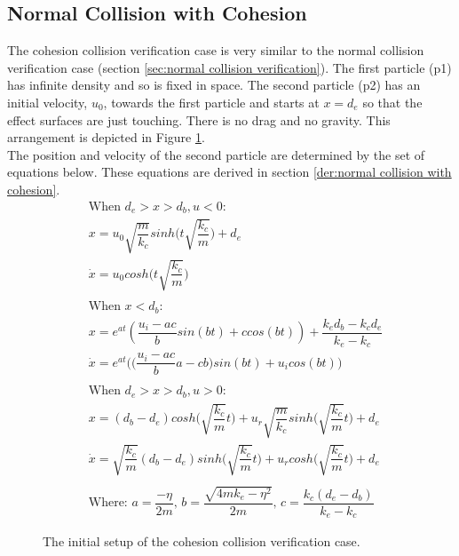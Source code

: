 \documentclass[a4paper,11pt,titlepage]{report}
\begin{document}
\subsection{Normal Collision with Cohesion}
\label{sec:normal collision with cohesion verification}
The cohesion collision verification case is very similar to the normal collision verification case (section \ref{sec:normal collision verification}). The first particle (p1) has infinite density and so is fixed in space. The second particle (p2) has an initial velocity, $u_0$, towards the first particle and starts at $x = d_e$ so that the effect surfaces are just touching. There is no drag and no gravity. This arrangement is depicted in Figure \ref{fig:cohesion collision}.
\\The position and velocity of the second particle are determined by the set of equations below. These equations are derived in section \ref{der:normal collision with cohesion}.
\begin{align}
&\text{When $d_e > x > d_b, u < 0$:} \nonumber \\
&x = u_0 \sqrt{\dfrac{m}{k_c}} sinh\Big(t\sqrt{\dfrac{k_c}{m}}\Big) + d_e \\
&\dot{x} = u_0 cos h\Big(t\sqrt{\dfrac{k_c}{m}}\Big) \\ \nonumber \\
&\text{When $x < d_b$:} \nonumber \\
&x = e^{at} (\dfrac{u_i - ac}{b} sin(bt) + c cos (bt)) + \dfrac{k_e d_b - k_c d_e}{k_e - k_c} \\
&\dot{x} = e^{at}\Big(\Big(\dfrac{u_i - ac}{b} a - c b\Big)sin(bt) + u_i cos(bt)\Big) \\ \nonumber \\
&\text{When $d_e > x > d_b, u > 0$:} \nonumber \\
&x = (d_b - d_e)cosh\Big(\sqrt{\dfrac{k_c}{m}} t\Big) + u_r \sqrt{\dfrac{m}{k_c}} sinh\Big(\sqrt{\dfrac{k_c}{m}}t\Big) + d_e \\
&\dot{x} = \sqrt{\dfrac{k_c}{m}}(d_b - d_e)sinh\Big(\sqrt{\dfrac{k_c}{m}} t\Big) + u_r cosh\Big(\sqrt{\dfrac{k_c}{m}}t\Big) + d_e \\ \nonumber \\
&\text{Where: } a = \dfrac{-\eta}{2m} \text{,    } b = \dfrac{\sqrt{4mk_e - \eta ^ 2}}{2m} \text{,    } c = \dfrac{k_c (d_e - d_b)}{k_e - k_c} \nonumber
\end{align}
\begin{figure}[!ht]
\centering

\caption{The initial setup of the cohesion collision verification case.}
\label{fig:cohesion collision}
\end{figure}
\end{document}
